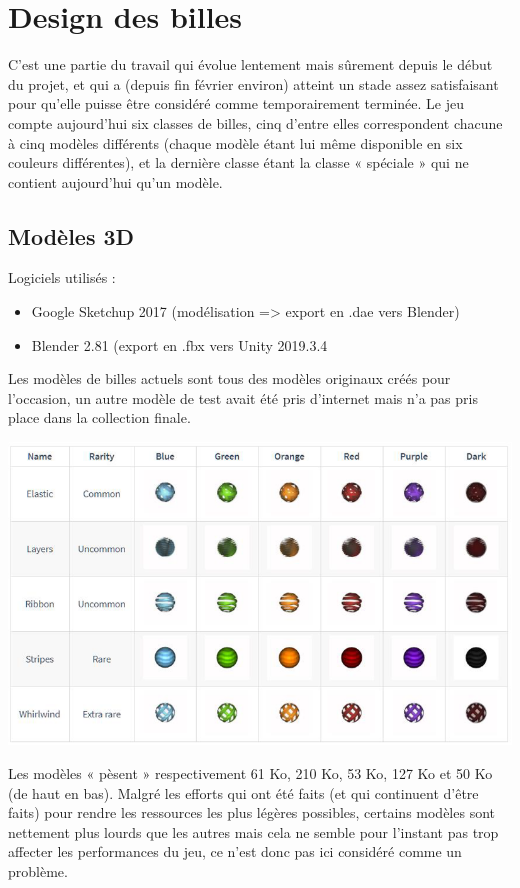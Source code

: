 \documentclass{article}
\begin{document}
\section{Design des billes}
C’est une partie du travail qui évolue lentement mais sûrement depuis le début du projet, et qui a (depuis fin février environ) atteint un stade assez satisfaisant pour qu’elle puisse être considéré comme temporairement terminée. Le jeu compte aujourd’hui six classes de billes, cinq d’entre elles correspondent chacune à cinq modèles différents (chaque modèle étant lui même disponible en six couleurs différentes), et la dernière classe étant la classe « spéciale » qui ne contient aujourd’hui qu’un modèle.

\subsection{Modèles 3D}
Logiciels utilisés :
\begin{itemize}
    \item Google Sketchup 2017 (modélisation => export en .dae vers Blender)
    \item Blender 2.81 (export en .fbx vers Unity 2019.3.4
\end{itemize}

Les modèles de billes actuels sont tous des modèles originaux créés pour l’occasion, un autre modèle de test avait été pris d’internet mais n’a pas pris place dans la collection finale.

\begin{center}
    \includegraphics[width=0.8\linewidth]{report/marbles.png}\\
\end{center}

Les modèles « pèsent » respectivement 61 Ko, 210 Ko, 53 Ko, 127 Ko et 50 Ko (de haut en bas). Malgré les efforts qui ont été faits (et qui continuent d’être faits) pour rendre les 	ressources les plus légères possibles, certains modèles sont nettement plus lourds que les autres mais cela ne semble pour l’instant pas trop affecter les performances du jeu, ce n’est donc pas ici considéré comme un problème.
\end{document}
